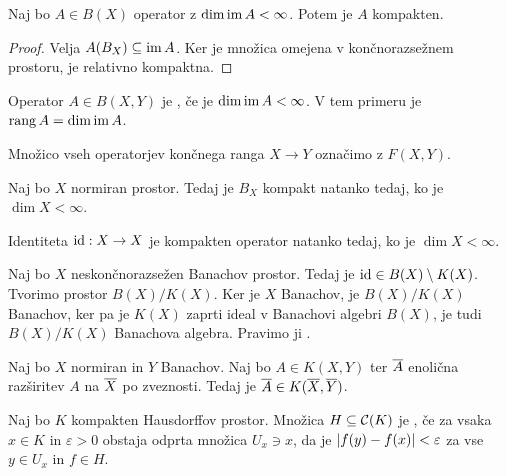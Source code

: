 
\begin{trditev}
  Naj bo $A \in B(X)$ operator z $\dim \operatorname{im} A < \infty$.
  Potem je $A$ kompakten.
\end{trditev}

\begin{proof}
  Velja $A(B_X) \subseteq \operatorname{im} A$.
  Ker je množica omejena v končnorazsežnem prostoru, je relativno kompaktna.
\end{proof}

\begin{definicija}
  Operator $A \in B(X,Y)$ je , če je $\dim \operatorname{im} A <
  \infty$.
  V tem primeru je $\operatorname{rang} A = \dim \operatorname{im} A$.
\end{definicija}

\begin{definicija}
  Množico vseh operatorjev končnega ranga $X \to Y$ označimo z $F(X,Y)$.
\end{definicija}


\begin{izrek}
  Naj bo $X$ normiran prostor.
  Tedaj je $B_X$ kompakt natanko tedaj, ko je $\dim X < \infty$.
\end{izrek}

\begin{posledica}
  Identiteta $\operatorname{id}: X \to X$ je kompakten operator natanko tedaj, ko je $\dim X <
  \infty$.
\end{posledica}

Naj bo $X$ neskončnorazsežen Banachov prostor.
Tedaj je $\operatorname{id} \in B(X) \setminus K(X)$.
Tvorimo prostor $B(X) / K(X)$.
Ker je $X$ Banachov, je $B(X)/K(X)$ Banachov, ker pa je $K(X)$ zaprti ideal v
Banachovi algebri $B(X)$, je tudi $B(X) / K(X)$ Banachova algebra.
Pravimo ji .

\begin{trditev}
  Naj bo $X$ normiran in $Y$ Banachov.
  Naj bo $A \in K(X,Y)$ ter $\overline{A}$ enolična razširitev $A$ na $\overline{X}$ po
  zveznosti.
  Tedaj je $\overline{A} \in K(\overline{X}, \overline{Y})$.
\end{trditev}


\begin{definicija}
  Naj bo $K$ kompakten Hausdorffov prostor. Množica $H \subseteq \mathcal{C}(K)$ je
  , če za vsaka $x \in K$ in $\varepsilon > 0$ obstaja odprta
  množica $U_x \ni x$, da je $\left| f(y) - f(x) \right| < \varepsilon$ za vse $y \in
  U_x$ in $f \in H$.
\end{definicija}

